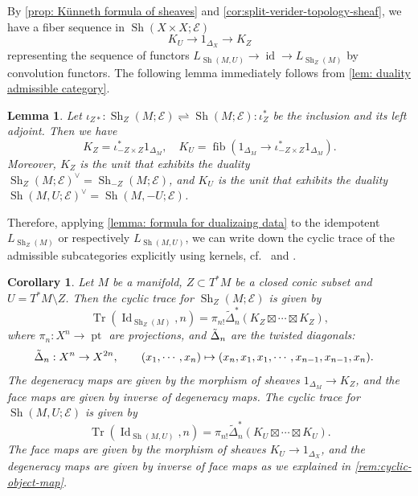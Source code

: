 \documentclass[11pt]{amsart}
\numberwithin{equation}{section}
\theoremstyle{plain}
\newtheorem{Lemma}[lemma]{Lemma}
\newtheorem{Coro}[coro]{Corollary}
\theoremstyle{definition}
\theoremstyle{remark}
\newcommand{\cE} { {\mathcal{E}}}
\newcommand{\pt}{{\operatorname{pt}}}
\newcommand{\id}{{\operatorname{id}}}
\newcommand{\Id}{{\operatorname{Id}}}
\newcommand{\Sh} { {\operatorname{Sh}}}
\newcommand\Tr{\operatorname{Tr}}
\newcommand\fib{\operatorname{fib}}
\begin{document}
By \autoref{prop: Künneth formula of sheaves} and \autoref{cor:split-verider-topology-sheaf}, we have a fiber sequence in $\Sh(X\times X;\cE)$
\[K_U\rightarrow 1_{\Delta_{X}}\rightarrow K_Z\]
representing the sequence of functors $L_{\Sh(M, U)}\rightarrow \id\rightarrow L_{\Sh_Z(M)}$ by convolution functors. The following lemma immediately follows from \autoref{lem: duality admissible category}.

\begin{Lemma}\label{lem:kernel as wrapping}
Let $\iota_{Z*}: \Sh_Z(M; \cE) \rightleftharpoons \Sh(M; \cE): \iota_Z^*$ be the inclusion and its left adjoint. Then we have
\[K_{Z} = \iota_{-Z \times Z}^*1_{\Delta_M}, \quad K_{U} = \fib(1_{\Delta_M} \to \iota_{-Z \times Z}^*1_{\Delta_M}).\]
Moreover, $K_Z$ is the unit that exhibits the duality $\Sh_Z(M; \cE)^\vee = \Sh_{-Z}(M; \cE)$, and $K_U$ is the unit that exhibits the duality $\Sh(M, U; \cE)^\vee = \Sh(M, -U; \cE)$.
\end{Lemma}

Therefore, applying \autoref{lemma: formula for dualizaing data} to the idempotent $L_{\Sh_Z(M)}$ or respectively $L_{\Sh(M, U)}$, we can write down the cyclic trace of the admissible subcategories explicitly using kernels, cf.~\cite[Section~3]{Hochschild-Kuo-Shende-Zhang} and \cite[Section~2]{zhang-cutoff}.

\begin{Coro}\label{cor:trace-sheaf}
Let $M$ be a manifold, $Z \subset T^*M$ be a closed conic subset and $U = T^*M \setminus Z$. Then the cyclic trace for $\Sh_Z(M; \cE)$ is given by
\[\Tr(\Id_{\Sh_Z(M)}, n)=\pi_{n!}\widetilde{\Delta}_n^* (K_{Z}\boxtimes \cdots\boxtimes K_{Z}), \]
where $\pi_{n} : X^n  \rightarrow \pt$ are projections, and $\Tilde{\Delta}_n$ are the twisted diagonals:
\begin{align*}
    \Tilde{\Delta}_n&: X^n \rightarrow X^{2n}, \qquad (x_1,\cdots,x_n)\mapsto (x_n,x_1,x_1,\cdots,x_{n-1},x_{n-1},x_n).
\end{align*}
The degeneracy maps are given by the morphism of sheaves $1_{\Delta_{M}} \to K_Z$, and the face maps are given by inverse of degeneracy maps. The cyclic trace for $\Sh(M, U; \cE)$ is given by
\[\Tr(\Id_{\Sh(M, U)}, n)=\pi_{n!}\widetilde{\Delta}_n^* (K_{U}\boxtimes \cdots\boxtimes K_{U} ). \]
The face maps are given by the morphism of sheaves $K_U\rightarrow 1_{\Delta_{X}}$, and the degeneracy maps are given by inverse of face maps as we explained in \autoref{rem:cyclic-object-map}.
\end{Coro}
\end{document}
